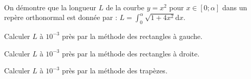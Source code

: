 \exer{[INT-004]}
\setcounter{numques}{0}~\\

On démontre que la longueur $L$ de la courbe $y=x^2$ pour $x\in[0;\alpha]$ dans un repère orthonormal est donnée par :
$L=\int_0^\alpha\sqrt{1+4x^2}\text{d}x$.

\question{} Calculer $L$ à $10^{-3}$ près par la méthode des rectangles à gauche.

\question{} Calculer $L$ à $10^{-3}$ près par la méthode des rectangles à droite.

\question{} Calculer $L$ à $10^{-3}$ près par la méthode des trapèzes.